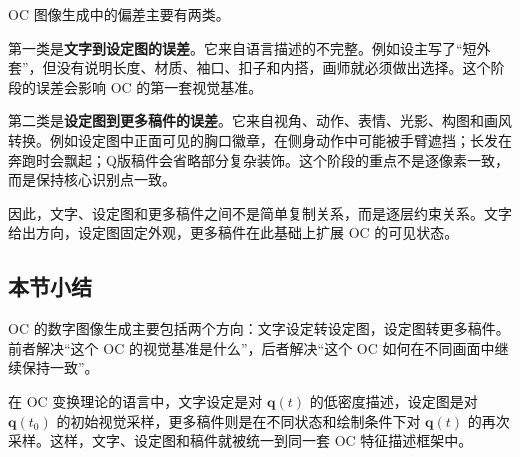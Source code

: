 OC 图像生成中的偏差主要有两类。

第一类是\textbf{文字到设定图的误差}。它来自语言描述的不完整。例如设主写了“短外套”，但没有说明长度、材质、袖口、扣子和内搭，画师就必须做出选择。这个阶段的误差会影响 OC 的第一套视觉基准。

第二类是\textbf{设定图到更多稿件的误差}。它来自视角、动作、表情、光影、构图和画风转换。例如设定图中正面可见的胸口徽章，在侧身动作中可能被手臂遮挡；长发在奔跑时会飘起；Q版稿件会省略部分复杂装饰。这个阶段的重点不是逐像素一致，而是保持核心识别点一致。

因此，文字、设定图和更多稿件之间不是简单复制关系，而是逐层约束关系。文字给出方向，设定图固定外观，更多稿件在此基础上扩展 OC 的可见状态。

\subsection{本节小结}

OC 的数字图像生成主要包括两个方向：文字设定转设定图，设定图转更多稿件。前者解决“这个 OC 的视觉基准是什么”，后者解决“这个 OC 如何在不同画面中继续保持一致”。

在 OC 变换理论的语言中，文字设定是对 $\mathbf{q}(t)$ 的低密度描述，设定图是对 $\mathbf{q}(t_0)$ 的初始视觉采样，更多稿件则是在不同状态和绘制条件下对 $\mathbf{q}(t)$ 的再次采样。这样，文字、设定图和稿件就被统一到同一套 OC 特征描述框架中。
